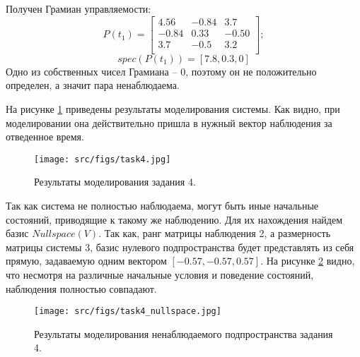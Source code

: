 Получен Грамиан управляемости:
\[
        P(t_1) = \begin{bmatrix}
        4.56 & -0.84 & 3.7 \\
        -0.84 & 0.33 & -0.50 \\
        3.7 & -0.5 & 3.2 \\
        \end{bmatrix};
\]
\[
        spec(P(t_1)) = [7.8,  0.3, 0]
\]
Одно из собственных чисел Грамиана -- 0, поэтому он не положительно определен, а значит пара ненаблюдаема.

На рисунке \ref{fig:task4} приведены результаты моделирования системы. Как видно, при моделировании она действительно пришла в нужный вектор наблюдения за отведенное время.
\begin{figure}[ht!]
        \centering
        \texttt{[image: src/figs/task4.jpg]}
        \caption{Результаты моделирования задания 4.}
        \label{fig:task4}
\end{figure}

Так как система не полностью наблюдаема, могут быть иные начальные состояний, приводящие к такому же наблюдению. Для их нахождения найдем базис \(Nullspace(V)\). Так как, ранг матрицы наблюдения 2, а размерность матрицы системы 3, базис нулевого подпространства будет представлять из себя прямую, задаваемую одним вектором \([-0.57, -0.57, 0.57]\).
На рисунке \ref{fig:task4_null} видно, что несмотря на различные начальные условия и поведение состояний, наблюдения полностью совпадают.
\begin{figure}[ht!]
        \centering
        \texttt{[image: src/figs/task4\_nullspace.jpg]}
        \caption{Результаты моделирования ненаблюдаемого подпространства задания 4.}
        \label{fig:task4_null}
\end{figure}

